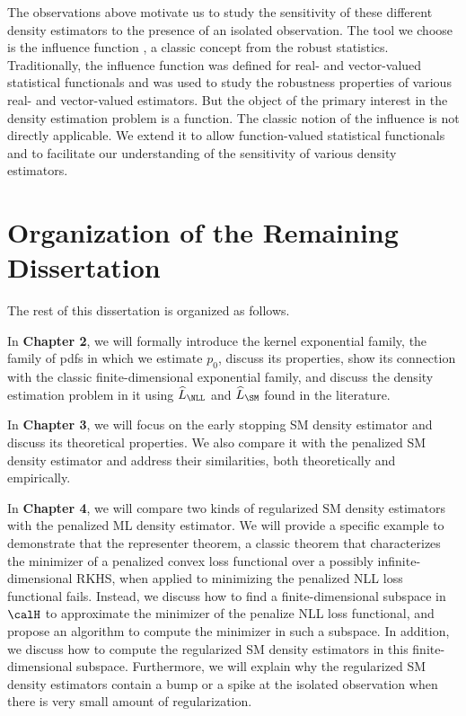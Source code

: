 \documentclass[12pt]{article}
\theoremstyle{definition}
\theoremstyle{theorem}
\theoremstyle{remark}
\begin{document}
The observations above motivate us to study the sensitivity of these different density estimators to the presence of an isolated observation. The tool we choose is the influence function \parencite{Hampel1968-gm}, a classic concept from the robust statistics. Traditionally, the influence function was defined for real- and vector-valued statistical functionals and was used to study the robustness properties of various real- and vector-valued estimators. But the object of the primary interest in the density estimation problem is a function. The classic notion of the influence is not directly applicable. We extend it to allow function-valued statistical functionals and to facilitate our understanding of the sensitivity of various density estimators. 


\section{Organization of the Remaining Dissertation}\label{section-organization}

The rest of this dissertation is organized as follows. 

In \textbf{\color{red}Chapter 2}, we will formally introduce the kernel exponential family, the family of pdfs in which we estimate $p_0$, discuss its properties, show its connection with the classic finite-dimensional exponential family, and discuss the density estimation problem in it using $\widehat{L}_{\NLL}$ and $\widehat{L}_{\SM}$ found in the literature. 

In \textbf{\color{red}Chapter 3}, we will focus on the early stopping SM density estimator and discuss its theoretical properties. We also compare it with the penalized SM density estimator and address their similarities, both theoretically and empirically. 

In \textbf{\color{red}Chapter 4}, we will compare two kinds of regularized SM density estimators with the penalized ML density estimator. We will provide a specific example to demonstrate that the representer theorem, a classic theorem that characterizes the minimizer of a penalized convex loss functional over a possibly infinite-dimensional RKHS, when applied to minimizing the penalized NLL loss functional fails. Instead, we discuss how to find a finite-dimensional subspace in $\calH$ to approximate the minimizer of the penalize NLL loss functional, and propose an algorithm to compute the minimizer in such a subspace. In addition, we discuss how to compute the regularized SM density estimators in this finite-dimensional subspace. Furthermore, we will explain why the regularized SM density estimators contain a bump or a spike at the isolated observation when there is very small amount of regularization. 
\end{document}

